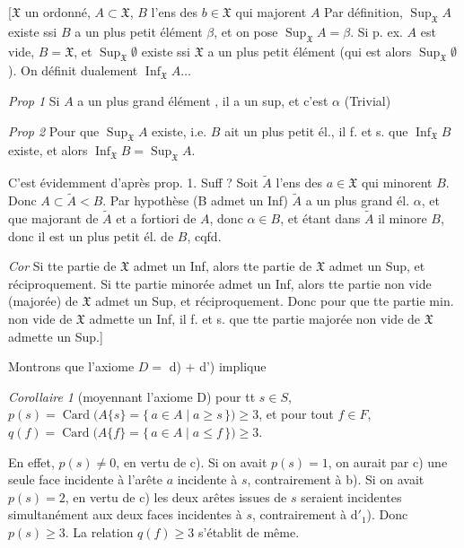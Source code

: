 \documentclass[11pt,a4paper]{article}
\begin{document}
[$\mathfrak{X}$ un ordonné, $A \subset \mathfrak{X}$, $B$ l'ens des
$b \in \mathfrak{X}$ qui majorent $A$ \struck{\ill{}} Par définition,
$\operatorname{Sup}_{\mathfrak{X}} A$ existe ssi $B$ a un plus petit élément
$\beta$, et on pose \struck{\ill{}} $\operatorname{Sup}_{\mathfrak{X}} A = \beta$.
Si p. ex. $A$ est vide, $B = \mathfrak{X}$, et
$\operatorname{Sup}_{\mathfrak{X}} \emptyset$ existe ssi $\mathfrak{X}$ a un
plus petit élément (qui est alors $\operatorname{Sup}_{\mathfrak{X}} \emptyset$).
On définit dualement $\operatorname{Inf}_{\mathfrak{X}} A \ldots$

\emph{Prop 1} Si $A$ a un plus grand élément \add{$\alpha$}, il a un sup, et c'est
$\alpha$ (Trivial)

\emph{Prop 2} Pour que $\operatorname{Sup}_{\mathfrak{X}} A$ existe, i.e. $B$
ait un plus petit él., il f. et s. que $\operatorname{Inf}_{\mathfrak{X}} B$
existe, et alors $\operatorname{Inf}_{\mathfrak{X}} B = \operatorname{Sup}_{\mathfrak{X}} A$.


C'est évidemment  d'après prop. 1. Suff ? Soit
$\widetilde{A}$ l'ens des $a \in \mathfrak{X}$ qui minorent $B$. Donc
$A \subset \widetilde{A} < B$. Par hypothèse (B admet un Inf) $\widetilde{A}$ a
un plus grand él. $\alpha$, et que majorant de $\widetilde{A}$ et a fortiori
 de $A$, donc $\alpha \in B$, et étant dans
$\widetilde{A}$ il minore $B$, donc il est un plus petit él. de $B$, cqfd.

\emph{Cor} Si tte partie de $\mathfrak{X}$ admet un Inf, alors tte partie de
$\mathfrak{X}$ admet un Sup, et réciproquement.  Si tte partie \struck{\ill{}} minorée  admet un
Inf, alors tte partie non vide (majorée) de $\mathfrak{X}$ admet un Sup, et
réciproquement. Donc pour que tte partie min. non vide de $\mathfrak{X}$
admette un Inf, il f. et s. que tte partie majorée non vide de
$\mathfrak{X}$ admette un Sup.]


Montrons que l'axiome $D = $ d) + d') implique

\emph{Corollaire 1} (moyennant l'axiome D) pour tt $s \in S$,
\struck{\ill{}} $p(s) = \operatorname{Card}\bigl(A\{s\} = \{\, a \in A \mid a \geq s \,\}\bigr) \geq 3$,
et pour tout $f \in F$,
$q(f) = \operatorname{Card}\bigl(A\{f\} = \{\, a \in A \mid a \leq f \,\}\bigr) \geq 3$.

En effet,  $p(s) \neq 0$, en vertu de c). Si on avait
$p(s) = 1$, on aurait par c) une  seule face incidente à l'arête
$a$ incidente à $s$, contrairement à b). Si on avait $p(s) = 2$, en vertu de
c) les deux arêtes issues de $s$ seraient incidentes simultanément aux deux
faces incidentes à $s$, contrairement à d$'_1$). Donc $p(s) \geq 3$. La relation
$q(f) \geq 3$ s'établit de même.
\end{document}

